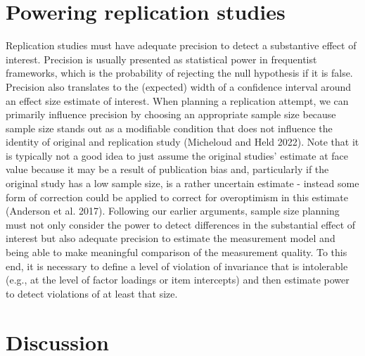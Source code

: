 \documentclass[
  12pt,
  letterpaper,
  man]{apa7}
\begin{document}
\section{Powering replication
studies}\label{powering-replication-studies}

Replication studies must have adequate precision to detect a substantive
effect of interest. Precision is usually presented as statistical power
in frequentist frameworks, which is the probability of rejecting the
null hypothesis if it is false. Precision also translates to the
(expected) width of a confidence interval around an effect size estimate
of interest. When planning a replication attempt, we can primarily
influence precision by choosing an appropriate sample size because
sample size stands out as a modifiable condition that does not influence
the identity of original and replication study (Micheloud and Held
2022). Note that it is typically not a good idea to just assume the
original studies' estimate at face value because it may be a result of
publication bias and, particularly if the original study has a low
sample size, is a rather uncertain estimate - instead some form of
correction could be applied to correct for overoptimism in this estimate
(Anderson et al. 2017). Following our earlier arguments, sample size
planning must not only consider the power to detect differences in the
substantial effect of interest but also adequate precision to estimate
the measurement model and being able to make meaningful comparison of
the measurement quality. To this end, it is necessary to define a level
of violation of invariance that is intolerable (e.g., at the level of
factor loadings or item intercepts) and then estimate power to detect
violations of at least that size.

\section{Discussion}\label{discussion}
\end{document}

